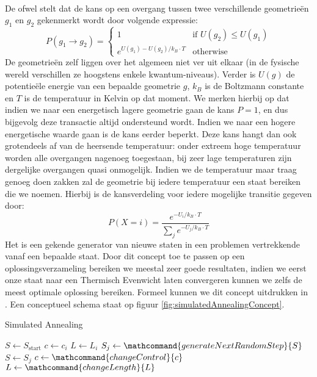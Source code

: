 \paragraph{}De  ofwel  stelt dat de kans op een overgang tussen twee verschillende geometrieën $g_1$ en $g_2$ gekenmerkt wordt door volgende expressie:
\begin{equation}
P\left(g_1\rightarrow g_2\right)=\left\{\begin{array}{ll}
1&\mbox{if } U\left(g_2\right)\leq U\left(g_1\right)\\
e^{U\left(g_1\right)-U\left(g_2\right)/k_B\cdot T}&\mbox{otherwise}
\end{array}\right.
\end{equation}
De geometrieën zelf liggen over het algemeen niet ver uit elkaar (in de fysische wereld verschillen ze hoogstens enkele kwantum-niveaus). Verder is $U\left(g\right)$ de potentieële energie van een bepaalde geometrie $g$, $k_B$ is de Boltzmann constante en $T$ is de temperatuur in Kelvin op dat moment. We merken hierbij op dat indien we naar een energetisch lagere geometrie gaan de kans $P=1$, en dus bijgevolg deze transactie altijd ondersteund wordt. Indien we naar een hogere energetische waarde gaan is de kans eerder beperkt. Deze kans hangt dan ook grotendeels af van de heersende temperatuur: onder extreem hoge temperatuur worden alle overgangen nagenoeg toegestaan, bij zeer lage temperaturen zijn dergelijke overgangen quasi onmogelijk. Indien we de temperatuur maar traag genoeg doen zakken zal de geometrie bij iedere temperatuur een staat bereiken die we  noemen. Hierbij is de kansverdeling voor iedere mogelijke transitie gegeven door:
\begin{equation}
P\left(X=i\right)=\displaystyle\frac{e^{-U_i/k_B\cdot T}}{\sum_j e^{-U_j/k_B\cdot T}}
\end{equation}
Het  is een gekende generator van nieuwe staten in een problemen vertrekkende vanaf een bepaalde staat. Door dit concept toe te passen op een oplossingsverzameling bereiken we meestal zeer goede resultaten, indien we eerst onze staat naar een Thermisch Evenwicht laten convergeren kunnen we zelfs de meest optimale oplossing bereiken. Formeel kunnen we dit concept uitdrukken in . Een conceptueel schema staat op figuur \ref{fig:simulatedAnnealingConcept}.
\begin{algorithm}[htb]
\caption{Simulated Annealing}
\label{alg:simulatedAnnealing}
\begin{algorithmic}[1]
\STATE $S\leftarrow S_{\mbox{start}}$
\STATE $c\leftarrow c_i$
\STATE $L\leftarrow L_i$
\STATE $S_j\leftarrow\mathcommand{generateNextRandomStep}{S}$
\STATE $S\leftarrow S_j$
\ENDIF
\ENDFOR
\STATE $c\leftarrow\mathcommand{changeControl}{c}$
\STATE $L\leftarrow\mathcommand{changeLength}{L}$
\ENDWHILE
\end{algorithmic}
\end{algorithm}
